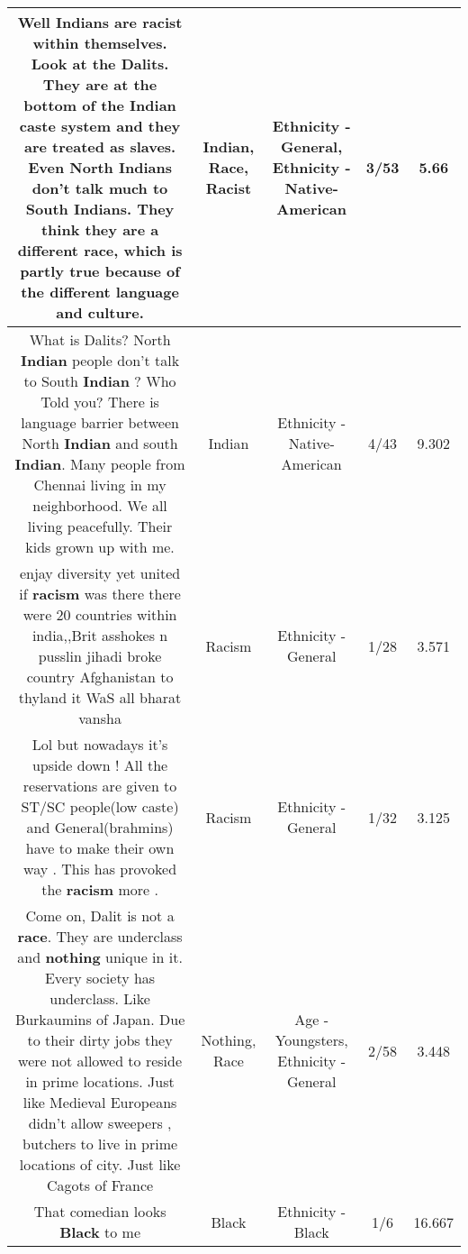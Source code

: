 \documentclass[11pt]{article}
\newlength\mylength
\begin{document}
\begin{center}
\begin{longtable}{|C{.65\mylength}|C{.30\mylength}|C{.12\mylength}|C{.12\mylength}|C{.12\mylength}|}
  \small Well Indians are \textbf{racist} within themselves. Look at the Dalits. They are at the bottom of the \textbf{Indian} caste system and they are treated as slaves. Even North Indians don't talk much to South Indians. They think they are a different \textbf{race}, which is partly true because of the different language and culture.\normalsize   & Indian, Race, Racist & Ethnicity - General, Ethnicity - Native-American & 3/53 & 5.66 \\  \hline
  \small What is Dalits? North \textbf{Indian} people don't talk to South \textbf{Indian} ? Who Told you? There is language barrier between North \textbf{Indian} and south \textbf{Indian}.  Many people from Chennai living in my neighborhood. We all living peacefully. Their kids grown up with me.\normalsize   & Indian & Ethnicity - Native-American & 4/43 & 9.302 \\  \hline
  \small enjay diversity yet united if \textbf{racism} was there there were 20 countries within india,,Brit asshokes n pusslin jihadi broke country Afghanistan to thyland it WaS all bharat vansha\normalsize   & Racism & Ethnicity - General & 1/28 & 3.571 \\  \hline
  \small Lol but nowadays it's upside down ! All the reservations are given to ST/SC people(low caste) and General(brahmins) have to make their own way . This has provoked the \textbf{racism} more .\normalsize   & Racism & Ethnicity - General & 1/32 & 3.125 \\  \hline
  \small Come on, Dalit is not a \textbf{race}. They are underclass and \textbf{nothing} unique in it. Every society has underclass. Like Burkaumins of Japan.  Due to their dirty jobs they were not allowed to reside in prime locations. Just like Medieval Europeans didn't allow sweepers , butchers to live in prime locations of city. Just like Cagots of France\normalsize   & Nothing, Race & Age - Youngsters, Ethnicity - General & 2/58 & 3.448 \\  \hline
  \small That comedian looks \textbf{Black} to me\normalsize   & Black & Ethnicity - Black & 1/6 & 16.667 \\  \hline

\end{longtable}
\end{center}
\end{document}
